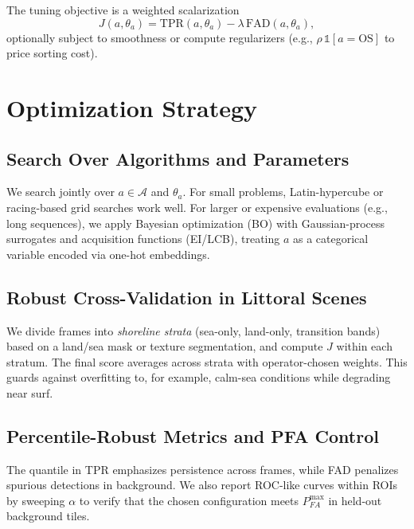 \documentclass[conf]{new-aiaa}
\begin{document}
The tuning objective is a weighted scalarization
\begin{equation}
J(a,\theta_a)= \mathrm{TPR}(a,\theta_a) - \lambda\, \mathrm{FAD}(a,\theta_a), \label{eq:objective}
\end{equation}
optionally subject to smoothness or compute regularizers (e.g., \(\rho\,\mathbb{1}[a=\text{OS}]\) to price sorting cost).

\section{Optimization Strategy}
\subsection{Search Over Algorithms and Parameters}
We search jointly over \(a\in\mathcal{A}\) and \(\theta_a\). For small problems, Latin-hypercube or racing-based grid searches work well. For larger or expensive evaluations (e.g., long sequences), we apply Bayesian optimization (BO) with Gaussian-process surrogates and acquisition functions (EI/LCB), treating \(a\) as a categorical variable encoded via one-hot embeddings.

\subsection{Robust Cross-Validation in Littoral Scenes}
We divide frames into \emph{shoreline strata} (sea-only, land-only, transition bands) based on a land/sea mask or texture segmentation, and compute \(J\) within each stratum. The final score averages across strata with operator-chosen weights. This guards against overfitting to, for example, calm-sea conditions while degrading near surf.

\subsection{Percentile-Robust Metrics and PFA Control}
The quantile in TPR emphasizes persistence across frames, while FAD penalizes spurious detections in background. We also report ROC-like curves within ROIs by sweeping \(\alpha\) to verify that the chosen configuration meets \(P_{FA}^{\max}\) in held-out background tiles.
\end{document}
